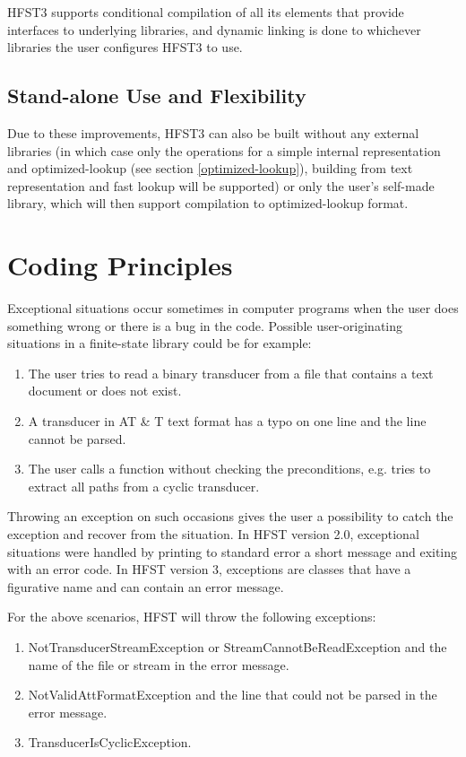 \documentclass{llncs}
\begin{document}
HFST3 supports conditional compilation of all its elements that provide
interfaces to underlying libraries, and dynamic linking is done to whichever
libraries the user configures HFST3 to use.

\subsection{Stand-alone Use and Flexibility}
Due to these improvements, HFST3 can also be built without any external
libraries (in which case only the operations for a simple internal
representation and optimized-lookup (see section \ref{optimized-lookup}),
building from text representation and fast lookup will be supported) or only
the user's self-made library, which will then support compilation to
optimized-lookup format.

\section{Coding Principles}

Exceptional situations occur sometimes in computer programs when the
user does something wrong or there is a bug in the code.
Possible user-originating situations in a finite-state library could
be for example:

\begin{enumerate} 
\item The user tries to read a binary transducer from a
file that contains a text document or does not exist.
\item A transducer in AT \& T text format has a typo on one line and the 
line cannot be parsed. 
\item The user calls a function without checking the preconditions,
e.g. tries to extract all paths from a cyclic transducer.
\end{enumerate}

Throwing an exception on such occasions gives the user a possibility
to catch the exception and recover from the situation. In HFST version
2.0, exceptional situations were handled by printing to standard error
a short message and exiting with an error code. In HFST version 3, 
exceptions are classes that have a figurative name and can contain an 
error message.

For the above scenarios, HFST will throw the following exceptions:

\begin{enumerate} 
\item NotTransducerStreamException or StreamCannotBeReadException and
the name of the file or stream in the error message.
\item NotValidAttFormatException and the line that could not be parsed
in the error message.
\item TransducerIsCyclicException.
\end{enumerate} 
\end{document}
